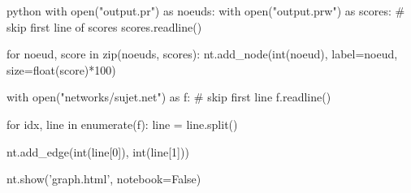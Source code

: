 \documentclass{NewTeX}
\begin{document}
\begin{code}{python}
with open("output.pr") as noeuds:
    with open("output.prw") as scores:
        # skip first line of scores
        scores.readline()

        for noeud, score in zip(noeuds, scores):
            nt.add_node(int(noeud), label=noeud, size=float(score)*100)

with open("networks/sujet.net") as f:
    # skip first line
    f.readline()

    for idx, line in enumerate(f):
        line = line.split()
        
        nt.add_edge(int(line[0]), int(line[1]))

nt.show('graph.html', notebook=False)
\end{code}
\end{document}

